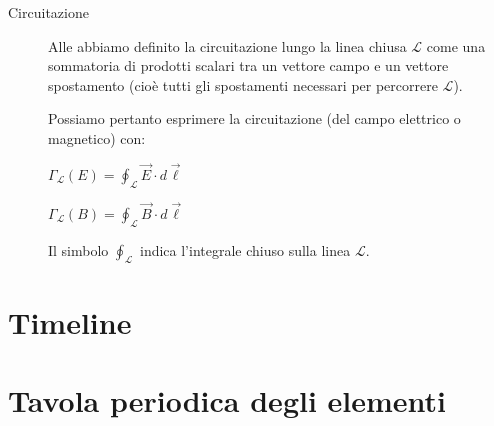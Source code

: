 \documentclass[a4paper,11pt,italian]{article}
\begin{document}
\begin{description}
  \item[Circuitazione] Alle  abbiamo definito la circuitazione lungo la linea chiusa $ \mathscr{L} $ 
  come una sommatoria di prodotti scalari tra un vettore campo e un vettore spostamento (cioè tutti gli spostamenti necessari per percorrere $ \mathscr{L} $). 
  
  Possiamo pertanto esprimere la circuitazione (del campo elettrico o magnetico) con:
  \begin{multicols}{2}
  \begin{center}
  $ \displaystyle \Gamma_\mathscr{L}(E) = \oint_\mathscr{L} \vec{E} \cdot d\vec{\ell} $
  
  $ \displaystyle \Gamma_\mathscr{L}(B) = \oint_\mathscr{L} \vec{B} \cdot d\vec{\ell} $
  \end{center}
  \end{multicols}
  Il simbolo $ \oint_\mathscr{L} $ indica l'integrale chiuso sulla linea $ \mathscr{L} $.
\end{description}



\newpage
\section{Timeline}
\begin{turn}{90}
\begin{minipage}{\linewidth}
\scalebox{.66}{}
\end{minipage}
\end{turn}

\newpage
\section{Tavola periodica degli elementi}

\end{document}
